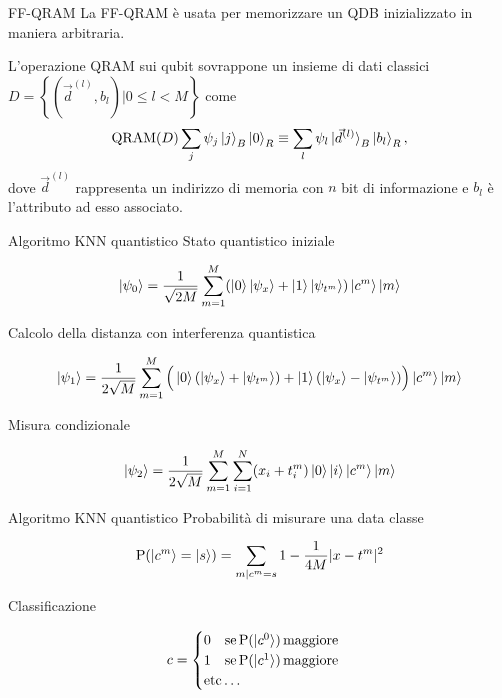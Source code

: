 \documentclass{beamer}
\begin{document}
    \begin{frame}{FF-QRAM}
        La FF-QRAM è usata per memorizzare un QDB inizializzato in maniera arbitraria. 

        L'operazione QRAM sui qubit sovrappone un insieme di dati classici 
        $D = \left\{ \left( \vec{d}^{(l)}, b_l \right) \Big| 0 \leq l < M \right\}$ come
        \begin{equation*} \label{eq:qram}
            \text{QRAM}(D) \sum_j \psi_j \ket{j}_B \ket{0}_R \equiv 
            \sum_l \psi_l \ket{\vec{d}^{(l)}}_B \ket{b_l}_R,
        \end{equation*}
        dove $\vec{d}^{(l)}$ rappresenta un indirizzo di memoria con 
        $n$ bit di informazione 
        e $b_l$ è l'attributo ad esso associato. 
    \end{frame}

    \begin{frame}{Algoritmo KNN quantistico}
        Stato quantistico iniziale

		\begin{equation*}
			\ket{\psi_0} = \frac{1}{\sqrt{2M}} \sum_{m=1}^M 
			(\ket{0}\ket{\psi_x}+\ket{1}\ket{\psi_{t^m}})\ket{c^m}\ket{m}
		\end{equation*}

		Calcolo della distanza con interferenza quantistica

		\begin{equation*}
			\ket{\psi_1} = \frac{1}{2\sqrt{M}}\sum_{m=1}^M 
			\Big( \ket{0}(\ket{\psi_x}+\ket{\psi_{t^m}}) + \ket{1}(\ket{\psi_x}-\ket{\psi_{t^m}}) \Big) \ket{c^m}\ket{m}
		\end{equation*}
	
		Misura condizionale

		\begin{equation*}
			\ket{\psi_2} = \frac{1}{2\sqrt{M}} \sum_{m=1}^M \sum_{i=1}^N
			(x_i+t_i^m)\ket{0}\ket{i}\ket{c^m}\ket{m}
		\end{equation*}
    \end{frame}

    \begin{frame}{Algoritmo KNN quantistico}
        Probabilità di misurare una data classe

		\begin{equation*}
			\text{P}(\ket{c^m} = \ket{s}) = \sum_{m|c^m=s} 
			1 - \frac{1}{4M} |x-t^m|^2
		\end{equation*}

		Classificazione

		\begin{equation*}
			c = \begin{cases}
			0 \quad \text{se}\, \text{P}(\ket{c^0})\, \text{maggiore} \\
			1 \quad \text{se}\, \text{P}(\ket{c^1})\, \text{maggiore} \\
			\text{etc}\ldots
		\end{cases}
		\end{equation*}
    \end{frame}
\end{document}
